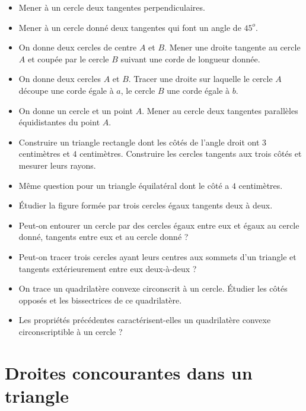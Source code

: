 \documentclass[12 pt]{report}
\theoremstyle{plain}
\newcounter{n}
\renewcommand{\it}{\item[$\mathbf{\then}.$]\stepcounter{n} }
\begin{document}
\begin{itemize}
 \it Mener à un cercle deux tangentes perpendiculaires. 
 \it Mener à un cercle donné deux tangentes qui font un angle de $45^o$. 
 \it On donne deux cercles de centre $A$ et $B$. Mener une droite tangente au cercle $A$ et coupée par le cercle $B$ suivant une corde de longueur donnée.
 \it On donne deux cercles $A$ et $B$. Tracer une droite sur laquelle le cercle $A$ découpe une corde égale à $a$, le cercle $B$ une corde égale à $b$. 
 \it On donne un cercle et un point $A$. Mener au cercle deux tangentes parallèles équidistantes du point $A$. 
 \it Construire un triangle rectangle dont les côtés de l'angle droit
 ont $3$ centimètres et $4$ centimètres. Construire les cercles tangents aux trois côtés et mesurer leurs rayons. 
 \it Même question pour un triangle équilatéral dont le côté a $4$ centimètres. 
 \it Étudier la figure formée par trois cercles égaux tangents deux à deux. 
 \it Peut-on entourer un cercle par des cercles égaux entre eux et égaux au cercle donné, tangents entre eux et au cercle donné ? 
 \it Peut-on tracer trois cercles ayant leurs centres aux sommets d'un triangle et tangents extérieurement entre eux deux-à-deux ? 
 \it On trace un quadrilatère convexe circonscrit à un cercle. Étudier les côtés opposés et les bissectrices de ce quadrilatère.
 \it Les propriétés précédentes caractérisent-elles un quadrilatère convexe circonscriptible à un cercle ?
 \end{itemize}
 \chapter{Droites concourantes dans un triangle}
 
\end{document}
